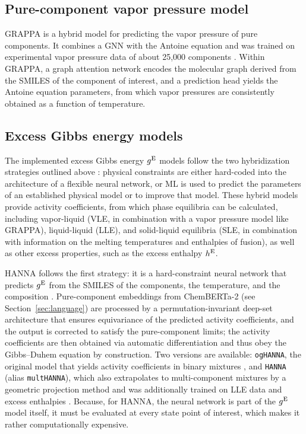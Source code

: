 \documentclass{juliacon}
\begin{document}
\subsection{Pure-component vapor pressure model} \label{sec:pure}

GRAPPA is a hybrid model for predicting the vapor pressure of pure components. It combines a GNN with the Antoine equation and was trained on experimental vapor pressure data of about 25,000 components \cite{hoffmann_grappahybrid_2025}. Within GRAPPA, a graph attention network encodes the molecular graph derived from the SMILES of the component of interest, and a prediction head yields the Antoine equation parameters, from which vapor pressures are consistently obtained as a function of temperature. 


\subsection{Excess Gibbs energy models} \label{sec:mix}

The implemented excess Gibbs energy $g^{\rm E}$ models follow the two hybridization strategies outlined above \cite{hasse_artificial_2026}: physical constraints are either hard-coded into the architecture of a flexible neural network, or ML is used to predict the parameters of an established physical model or to improve that model.
These hybrid models provide activity coefficients, from which phase equilibria can be calculated, including vapor-liquid (VLE, in combination with a vapor pressure model like GRAPPA), liquid-liquid (LLE), and solid-liquid equilibria (SLE, in combination with information on the melting temperatures and enthalpies of fusion), as well as other excess properties, such as the excess enthalpy $h^{\rm E}$.

HANNA follows the first strategy: it is a hard-constraint neural network that predicts $g^{\rm E}$ from the SMILES of the components, the temperature, and the composition \cite{specht_hanna_2024-1}.
Pure-component embeddings from ChemBERTa-2 (see Section~\ref{sec:language}) are processed by a permutation-invariant deep-set architecture that ensures equivariance of the predicted activity coefficients, and the output is corrected to satisfy the pure-component limits; the activity coefficients are then obtained via automatic differentiation and thus obey the Gibbs--Duhem equation by construction.
Two versions are available: \texttt{ogHANNA}, the original model that yields activity coefficients in binary mixtures \cite{specht_hanna_2024-1}, and \texttt{HANNA} (alias \texttt{multHANNA}), which also extrapolates to multi-component mixtures by a geometric projection method and was additionally trained on LLE data and excess enthalpies \cite{hoffmann_thermodynamically_2026}. 
Because, for HANNA, the neural network is part of the $g^{\rm E}$ model itself, it must be evaluated at every state point of interest, which makes it rather computationally expensive.
\end{document}
